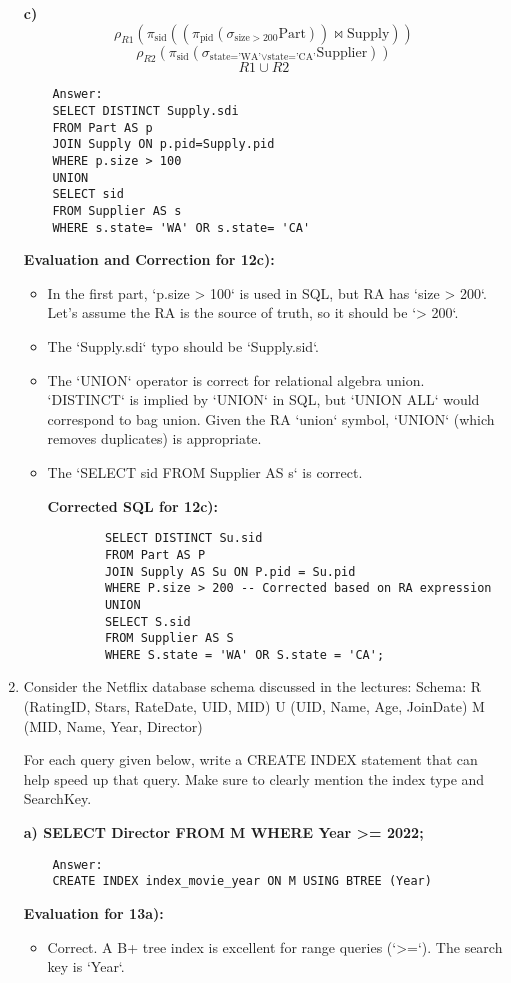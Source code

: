 \documentclass{article}
\begin{document}
\begin{enumerate}[label=\textbf{Question \arabic*.}]
    \textbf{c) $$\rho_{R1}(\pi_{\text{sid}}((\pi_{\text{pid}} (\sigma_{\text{size}>200} \text{Part})) \bowtie \text{Supply}))$$
       $$\rho_{R2}(\pi_{\text{sid}}(\sigma_{\text{state='WA'} \vee \text{state='CA'}} \text{Supplier}))$$
       $$R1 \cup R2$$}
    \begin{lstlisting}
    Answer:
    SELECT DISTINCT Supply.sdi
    FROM Part AS p
    JOIN Supply ON p.pid=Supply.pid
    WHERE p.size > 100
    UNION
    SELECT sid
    FROM Supplier AS s
    WHERE s.state= 'WA' OR s.state= 'CA'
    \end{lstlisting}
    \textbf{Evaluation and Correction for 12c):}
    \begin{itemize}
        \item In the first part, `p.size > 100` is used in SQL, but RA has `size > 200`. Let's assume the RA is the source of truth, so it should be `> 200`.
        \item The `Supply.sdi` typo should be `Supply.sid`.
        \item The `UNION` operator is correct for relational algebra union. `DISTINCT` is implied by `UNION` in SQL, but `UNION ALL` would correspond to bag union. Given the RA `union` symbol, `UNION` (which removes duplicates) is appropriate.
        \item The `SELECT sid FROM Supplier AS s` is correct.

        \textbf{Corrected SQL for 12c):}
        \begin{lstlisting}
        SELECT DISTINCT Su.sid
        FROM Part AS P
        JOIN Supply AS Su ON P.pid = Su.pid
        WHERE P.size > 200 -- Corrected based on RA expression
        UNION
        SELECT S.sid
        FROM Supplier AS S
        WHERE S.state = 'WA' OR S.state = 'CA';
        \end{lstlisting}
    \end{itemize}

\item Consider the Netflix database schema discussed in the lectures:
    Schema:
      R (RatingID, Stars, RateDate, UID, MID)
      U (UID, Name, Age, JoinDate)
      M (MID, Name, Year, Director)

    For each query given below, write a CREATE INDEX statement that can help speed up that query. Make sure to clearly mention the index type and SearchKey.

    \textbf{a) SELECT Director FROM M WHERE Year >= 2022;}
    \begin{lstlisting}
    Answer:
    CREATE INDEX index_movie_year ON M USING BTREE (Year)
    \end{lstlisting}
    \textbf{Evaluation for 13a):}
    \begin{itemize}
        \item Correct. A B+ tree index is excellent for range queries (`>=`). The search key is `Year`.
    \end{itemize}


\end{enumerate}
\end{document}
